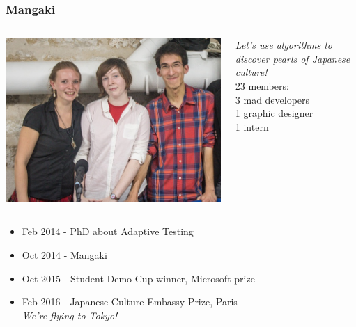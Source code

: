 \documentclass[handout]{beamer}
\begin{document}
\begin{frame}
  \frametitle{Mangaki}
  \begin{columns}
  \begin{column}{0.5\textwidth}
    \includegraphics[width=\textwidth]{figures/trio.jpg}
  \end{column}
  \begin{column}{0.5\textwidth}
    {\em Let's use algorithms to discover pearls of Japanese culture!}\\[5mm]
    23 members:\\\hspace{7mm} 3 mad developers\\\hspace{14mm} 1 graphic designer\\\hspace{21mm}  1 intern
  \end{column}
  \end{columns}
  \vspace{2mm}
  \begin{itemize}
  \item Feb 2014 - PhD about Adaptive Testing
  \item Oct 2014 - \alert{Mangaki}
  \item Oct 2015 - Student Demo Cup winner, Microsoft prize
  \item Feb 2016 - Japanese Culture Embassy Prize, Paris\\[1mm]\pause\hfill\small\em We're flying to Tokyo!
  \end{itemize}
\end{frame}
\end{document}
